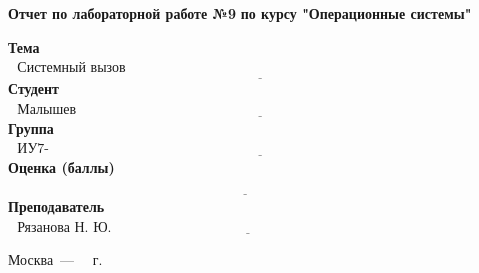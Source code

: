 \begin{titlepage}
	
	\begin{center}
		\Large\textbf{Отчет по лабораторной работе №9}
		\Large\textbf {по курсу "Операционные системы"}
	\end{center}

	
	\noindent\textbf{Тема} $\underline{\text{~~Системный вызов open()~~~~~~~~~~~~~~~~~~~~~~~~~~~~~~~~~~~~~~~~~~~~~~~~~~~~~~~~~~~~~~~~~~~~~~~~~~~~~~~~~~~~}}$\newline\newline\newline
	\noindent\textbf{Студент} $\underline{\text{~~Малышев И.Н.~~~~~~~~~~~~~~~~~~~~~~~~~~~~~~~~~~~~~~~~~~~~~~~~~~~~~~~~~~~~~~~~~~~~~~~~~~~~~~~~~~~~~~~~~~~~~~~}}$\newline\newline
	\noindent\textbf{Группа} $\underline{\text{~~ИУ7-64Б~~~~~~~~~~~~~~~~~~~~~~~~~~~~~~~~~~~~~~~~~~~~~~~~~~~~~~~~~~~~~~~~~~~~~~~~~~~~~~~~~~~~~~~~~~~~~~~~~~~~~~}}$\newline\newline
	\noindent\textbf{Оценка (баллы)} $\underline{\text{~~~~~~~~~~~~~~~~~~~~~~~~~~~~~~~~~~~~~~~~~~~~~~~~~~~~~~~~~~~~~~~~~~~~~~~~~~~~~~~~~~~~~~~~~~~~~~~~~~~~~~}}$\newline\newline
	\noindent\textbf{Преподаватель} $\underline{\text{~~Рязанова Н. Ю.~~~~~~~~~~~~~~~~~~~~~~~~~~~~~~~~~~~~~~~~~~~~~~~~~~~~~~~~~~~~~~~~~~~~~~~~~~~~~~~~~}}$\newline
	
	\begin{center}
		\vfill
		Москва~---~\the\year
		~г.
	\end{center}
	\restoregeometry
\end{titlepage}

